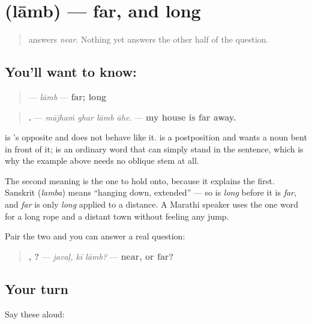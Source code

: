 \section[\texorpdfstring{\mr{लांब} (lāmb)}{लांब (lāmb)}]{ (lāmb) — far, and long}

\label{lesson:MR-C43-laamb}



\begin{quote}
\textbf{} answers \emph{near}. Nothing yet answers the other half of the question.
\end{quote}

\subsection*{You'll want to know: }
\begin{quote}
\textbf{} — \emph{lāmb} — \textbf{far; long}
\end{quote}

\begin{quote}
\textbf{   .} — \emph{mājhaṁ ghar lāmb āhe.} — \textbf{my house is far away.}
\end{quote}

\textbf{} is \textbf{}'s opposite and does not behave like it. \textbf{} is a postposition and wants a noun bent in front of it; \textbf{} is an ordinary word that can simply stand in the sentence, which is why the example above needs no oblique stem at all.

The second meaning is the one to hold onto, because it explains the first. Sanskrit \textbf{} (\emph{lamba}) means \textquotedblleft{}hanging down, extended\textquotedblright{} — so \textbf{} is \emph{long} before it is \emph{far}, and \emph{far} is only \emph{long} applied to a distance. A Marathi speaker uses the one word for a long rope and a distant town without feeling any jump.

Pair the two and you can answer a real question:

\begin{quote}
\textbf{,  ?} — \emph{javaḷ, kī lāmb?} — \textbf{near, or far?}
\end{quote}

\subsection*{Your turn}
Say these aloud:

